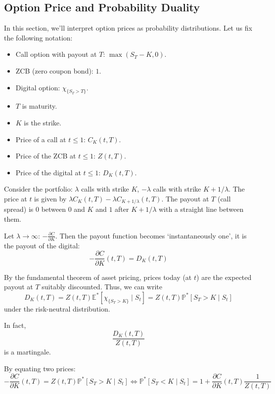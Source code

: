 
\subsection{Option Price and Probability Duality}

In this section, we'll interpret option prices as probability distributions. Let us fix the following notation:

\begin{itemize}
    \item Call option with payout at $T$: $\max (S_T - K, 0)$.
    \item ZCB (zero coupon bond): $1$.
    \item Digital option: $\chi_{\{S_T > T\}}$.
    \item $T$ is maturity.
    \item $K$ is the strike.
    \item Price of a call at $t \le 1$: $C_K(t, T)$.
    \item Price of the ZCB at $t \le 1$: $Z(t, T)$.
    \item Price of the digital at $t \le 1$: $D_K(t, T)$.
\end{itemize}

Consider the portfolio: $\lambda$ calls with strike $K$, $-\lambda$ calls with strike $K+1/\lambda$. The price at $t$ is given by $\lambda C_K(t, T) - \lambda C_{K + 1/\lambda}(t,T)$. The payout at $T$ (call spread) is $0$ between $0$ and $K$ and $1$ after $K + 1/\lambda$ with a straight line between them. 

Let $\lambda \to \infty$: $- \frac{\partial C}{\partial K}$. Then the payout function becomes `instantaneously one', it is the payout of the digital:
\[
    - \frac{\partial C}{\partial K}(t, T) = D_K(t, T)
\]

By the fundamental theorem of asset pricing, prices today (at $t$) are the expected payout at $T$ suitably discounted. Thus, we can write 
\[
    D_K(t, T) = Z(t, T)\mathbb{E}^\ast[\chi_{\{S_T > K\}} \mid S_t] = Z(t,T) \mathbb{P}^\ast[S_T > K \mid S_t]
\]
under the risk-neutral distribution. 

In fact, 
\[
    \frac{D_K(t, T)}{Z(t, T)}
\]
is a martingale. 

By equating two prices: 
\[
    - \frac{\partial C}{\partial K}(t, T) = Z(t,T) \mathbb{P}^\ast[S_T > K \mid S_t] \iff \mathbb{P}^\ast[S_T < K \mid S_t] = 1 + \frac{\partial C}{\partial K}(t, T) \frac{1}{Z(t, T)}
\]

